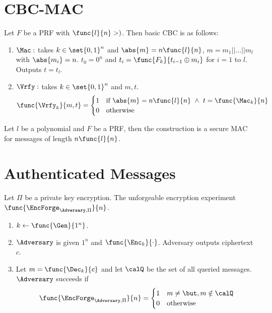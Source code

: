 \section{CBC-MAC}
Let \(F\) be a PRF with \(\func{l}{n} > )\). Then basic CBC is as follows:
\begin{enumerate}
    \item \(\Mac:\) takes \(k \in \set{0,1}^n\) and \(\abs{m} = n \func{l}{n}\), \(m = m_1 || \dots || m_l\) with \(\abs{m_i} = n\). \(t_0 = 0^n\) and \(t_i = \func{F_k}{t_{i-1} \oplus m_i}\) for \(i = 1\) to \(l\). Outputs \(t = t_l\).
    \item \(\Vrfy:\) takes \(k \in \set{0,1}^n\) and \(m,t\).
    \begin{equation*}
        \func{\Vrfy_k}{m,t} = \begin{cases}
            1 & \text{if} \ \abs{m} = n \func{l}{n} \ \land \ t= \func{\Mac_k}{n}\\ 
            0 & \text{otherwise}
        \end{cases}
    \end{equation*}
\end{enumerate}

\begin{theorem}
    Let \(l\) be a polynomial and \(F\) be a PRF, then the construction is a secure MAC for messages of length \(n \func{l}{n}\).
\end{theorem}

\section{Authenticated Messages}
Let \(\Pi\) be a private key encryption. The unforgeable encryption experiment \(\func{\EncForge_{\Adversary, \Pi}}{n}\).
\begin{enumerate}
    \item \(k \gets \func{\Gen}{1^n}\).
    \item \(\Adversary\) is given \(1^n\) and \(\func{\Enc_k}{\cdot}\). Adversary outputs ciphertext \(c\).
    \item Let \(m =  \func{\Dec_k}{c}\) and let \(\calQ\) be the set of all queried messages. \(\Adversary\) succeeds if 
    \begin{equation*}
        \func{\EncForge_{\Adversary, \Pi}}{n} = \begin{cases}
            1 & m \neq \but , m \notin \calQ \\
            0 & \text{otherwise}
        \end{cases}
    \end{equation*}
\end{enumerate}

